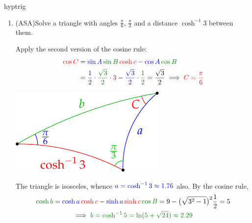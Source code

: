 \begin{examples}{}{hyptrig}
\begin{enumerate}
	  \item (ASA)\lstsp Solve a triangle with angles $\frac\pi 6$, $\frac\pi 3$ and a distance $\cosh^{-1}3$ between them.\par
	  \begin{minipage}[t]{0.65\linewidth}\vspace{-5pt}
	  	Apply the second version of the cosine rule:
	  	\begin{align*}
	  		\textcolor{red}{\cos C}& =\textcolor{blue}{\sin A} \, \textcolor{Green}{\sin B} \, \textcolor{red}{\cosh c}-\textcolor{blue}{\cos A} \, \textcolor{Green}{\cos B}\\
	  		&=\textcolor{blue}{\frac 12} \cdot \textcolor{Green}{\frac{\sqrt 3}2} \cdot \textcolor{red}{3} - \textcolor{blue}{\frac{\sqrt 3}2} \cdot \textcolor{Green}{\frac 12} =\frac{\sqrt 3}2 \implies\textcolor{red}{C=\frac\pi 6}
	  	\end{align*}
	  \end{minipage}
	  \hfill
	  \begin{minipage}[t]{0.34\linewidth}\vspace{-12pt}
	  	\flushright\includegraphics[scale=0.95]{isom-trigasa}
	  \end{minipage}\par
	  The triangle is isosceles, whence $\textcolor{blue}{a=\cosh^{-1}3\approx 1.76}$ also. By the cosine rule,
	  \begin{gather*}
	  	\textcolor{Green}{\cosh b}=\textcolor{blue}{\cosh a} \, \textcolor{red}{\cosh c} - \textcolor{blue}{\sinh a} \, \textcolor{red}{\sinh c} \, \textcolor{Green}{\cos B} =9-\bigl(\sqrt{3^2-1}\bigr)^2\frac 12 =5\\
	  	\implies \textcolor{Green}{b=\cosh^{-1}5=\ln(5+\sqrt{24})\approx 2.29}
	  \end{gather*}
	\end{enumerate}
\end{examples}


\goodbreak


\label{pg:hyptiling}

